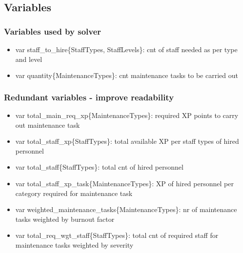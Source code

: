 \documentclass[12p,a4paper,twoside]{article}
\begin{document}
        \subsection{Variables}
          \subsubsection{Variables used by solver}
            \begin{itemize}
              \item var staff\_to\_hire\{StaffTypes, StaffLevels\}: cnt of staff needed as per type and level
              \item var quantity\{MaintenanceTypes\}: cnt maintenance tasks to be carried out
            \end{itemize}

          \subsubsection{Redundant variables - improve readability}
            \begin{itemize}
              \item var total\_main\_req\_xp\{MaintenanceTypes\}: required XP points to carry out maintenance task
              \item var total\_staff\_xp\{StaffTypes\}: total available XP per staff types of hired personnel
              \item var total\_staff\{StaffTypes\}: total cnt of hired personnel
              \item var total\_staff\_xp\_task\{MaintenanceTypes\}: XP of hired personnel per category required for maintenance task
              \item var weighted\_maintenance\_tasks\{MaintenanceTypes\}: nr of maintenance tasks weighted by burnout factor
              \item var total\_req\_wgt\_staff\{StaffTypes\}: total cnt of required staff for maintenance tasks weighted by severity
            \end{itemize}
        
\end{document}
